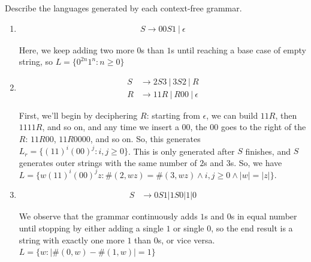 \documentclass[fleqn]{article}
\begin{document}
\noindent Describe the languages generated by each context-free grammar.
\begin{enumerate}
    \item 
    \[
        \begin{aligned}
            S \to 00 S 1~|~ \epsilon
        \end{aligned}
    \]
    \begin{answer}
        Here, we keep adding two more $0$s than $1$s until reaching a base case of empty string,
        so $\boxed{L = \{0^{2n} 1^{n} : n \geq 0\}}$
    \end{answer}
    \item 
    \[
        \begin{aligned}
            S &\to 2 S 3~|~ 3 S 2 ~|~ R \\
            R &\to 11R ~|~ R00 ~|~ \epsilon
        \end{aligned}
    \]
    \begin{answer}
        First, we'll begin by deciphering $R$: starting from $\epsilon$, we can build $11R$, then $1111R$, and so on, and any time we insert a $00$, the $00$ goes to the right of the $R$:
        $11R00$, $11R0000$, and so on. So, this generates $L_r = \{(11)^{i} (00)^{j} : i,j \geq 0\}$.
        This is only generated after $S$ finishes, and $S$ generates outer strings with the same number of $2$s and $3$s. So, we have\\$\boxed{L = \{w (11)^{i} (00)^{j} z : \#(2,wz) = \#(3,wz) \wedge i,j \geq 0 \wedge |w| = |z|\}}$.
    \end{answer}
    \item
    \[
        \begin{aligned}
            S &\to 0 S 1 | 1 S 0 | 1 | 0
        \end{aligned}
    \]
    \begin{answer}
        We observe that the grammar continuously adds $1$s and $0$s in equal number until stopping by either adding a single $1$ or single $0$, so the end result is a string with exactly one more $1$ than $0$s, or vice versa. $\boxed{L = \{w : |\#(0,w) - \#(1,w)| = 1\}}$
    \end{answer}
\end{enumerate}
\end{document}
